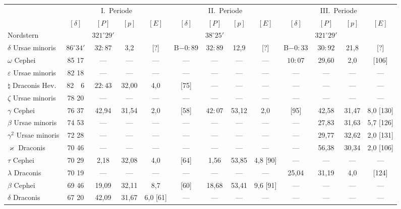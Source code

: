 \documentclass[12pt,a4paper]{article}
\theoremstyle{plain}
\theoremstyle{definition}
\theoremstyle{remark}
\begin{document}
\medskip
{\small
\begin{center}
\begin{tabular}{l|c c c c | c c c c | c c c c}
\toprule
& \multicolumn{4}{c|}{I.\ Periode} & \multicolumn{4}{c|}{II.\ Periode} & \multicolumn{4}{c}{III.\ Periode} \\
& $[\delta]$ & $[P]$ & $[p]$ & $[E]$ & $[\delta]$ & $[P]$ & $[p]$ & $[E]$ & $[\delta]$ & $[P]$ & $[p]$ & $[E]$ \\
\midrule
Nordstern & & $321^\circ 29'$ & & & & $38^\circ 25'$ & & & & $321^\circ 29'$ & & \\
$\delta$ Ursae minoris & $86^\circ 34'$ & $32\!\!:\!\!87$ & 3,2 & [?] & B$-0\!\!:\!\!89$ & $32\!\!:\!\!89$ & 12,9 & [?] & B$-0\!\!:\!\!33$ & $30\!\!:\!\!92$ & 21,8 & [?] \\
$\omega$ Cephei & 85 17 & --- & --- & --- & --- & --- & --- & --- & $10\!\!:\!\!07$ & 29,60 & 2,0 & [106] \\
$\varepsilon$ Ursae minoris & 82 18 & --- & --- & --- & --- & --- & --- & --- & --- & --- & --- & --- \\
$\natural$ Draconis Hev. & 82\ \ 6 & $22\!\!:\!\!43$ & 32,00 & 4,0 & [75] & --- & --- & --- & --- & --- & --- & --- \\
\midrule
$\zeta$ Ursae minoris & 78 20 & --- & --- & --- & --- & --- & --- & --- & --- & --- & --- & --- \\
$\gamma$ Cephei & 76 37 & 42,94 & 31,54 & 2,0 & [58] & $42\!\!:\!\!07$ & 53,12 & 2,0 & [95] & 42,58 & 31,47 & 8,0 [130] \\
$\beta$ Ursae minoris & 74 53 & --- & --- & --- & --- & --- & --- & --- & --- & 27,83 & 31,63 & 5,7 [126] \\
$\gamma^2$ Ursae minoris & 72 28 & --- & --- & --- & --- & --- & --- & --- & --- & 29,77 & 32,62 & 2,0 [131] \\
$\varkappa$ Draconis & 70 46 & --- & --- & --- & --- & --- & --- & --- & --- & 56,38 & 30,34 & 2,0 [106] \\
\midrule
$\tau$ Cephei & 70 29 & 2,18 & 32,08 & 4,0 & [64] & 1,56 & 53,85 & 4,8 [90] & --- & --- & --- & --- \\
$\lambda$ Draconis & 70 19 & --- & --- & --- & --- & --- & --- & --- & 25,04 & 31,19 & 4,0 & [124] \\
$\beta$ Cephei & 69 46 & 19,09 & 32,11 & 8,7 & [60] & 18,68 & 53,41 & 9,6 [91] & --- & --- & --- & --- \\
$\delta$ Draconis & 67 20 & 42,09 & 31,67 & 6,0 [61] & --- & --- & --- & --- & --- & --- & --- & --- \\

\end{tabular}
\end{center}}
\end{document}

